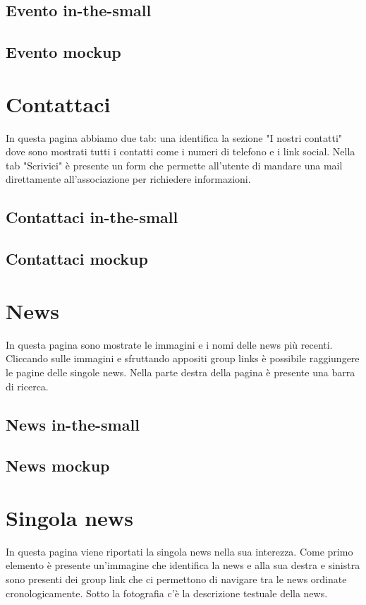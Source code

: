         \subsection{Evento in-the-small}

        \subsection{Evento mockup}

    \section{Contattaci}
    In questa pagina abbiamo due tab: una identifica la sezione "I nostri
    contatti" dove sono mostrati tutti i contatti come i numeri di telefono e i
    link social. Nella tab "Scrivici" è presente un form che permette all'utente
    di mandare una mail direttamente all'associazione per richiedere
    informazioni.

        \subsection{Contattaci in-the-small}

        \subsection{Contattaci mockup}
    
    \section{News}
    In questa pagina sono mostrate le immagini e i nomi delle news più recenti.
    Cliccando sulle immagini e sfruttando appositi group links è possibile
    raggiungere le pagine delle singole news. Nella parte destra della pagina è
    presente una barra di ricerca.

        \subsection{News in-the-small}

        \subsection{News mockup}
    
    \section{Singola news}
    In questa pagina viene riportati la singola news nella sua interezza. Come
    primo elemento è presente un'immagine che identifica la news e alla sua
    destra e sinistra sono presenti dei group link che ci permettono di navigare
    tra le news ordinate cronologicamente. Sotto la fotografia c'è la
    descrizione testuale della news.

